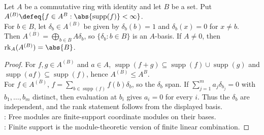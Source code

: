 \begin{theorem} \label{thm:finite-support-functions-free-module} \\
Let $A$ be a commutative ring with identity and let $B$ be a set. Put $A^{(B)}\defeq\{f\in A^B:\abs{\operatorname{supp}(f)}<\infty\}$.\\
For $b\in B$, let $\delta_b\in A^{(B)}$ be given by $\delta_b(b)=1$ and $\delta_b(x)=0$ for $x\neq b$.\\
Then $A^{(B)}=\bigoplus\limits_{b\in B}A\delta_b$, so $\{\delta_b:b\in B\}$ is an $A$-basis. If $A\neq0$, then $\operatorname{rk}_A(A^{(B)})=\abs{B}$.
\begin{proof}
For $f,g\in A^{(B)}$ and $a\in A$, $\operatorname{supp}(f+g)\subseteq\operatorname{supp}(f)\cup\operatorname{supp}(g)$ and $\operatorname{supp}(af)\subseteq\operatorname{supp}(f)$, hence $A^{(B)}\leq A^B$.\\
For $f\in A^{(B)}$, $f=\sum\limits_{b\in\operatorname{supp}(f)}f(b)\delta_b$, so the $\delta_b$ span.
If $\sum\limits_{j=1}^{m}a_j\delta_{b_j}=0$ with $b_1,\ldots,b_m$ distinct, then evaluation at $b_i$ gives $a_i=0$ for every $i$. Thus the $\delta_b$ are independent, and the rank statement follows from the displayed basis.\\
: Free modules are finite-support coordinate modules on their bases.\\
: Finite support is the module-theoretic version of finite linear combination.
\end{proof}
\end{theorem}

